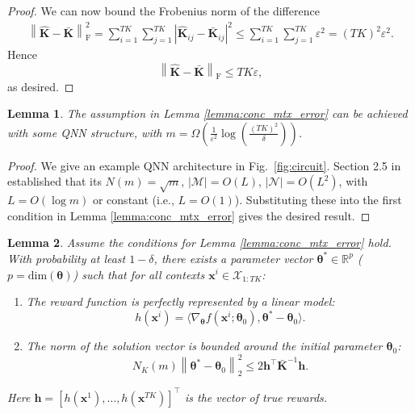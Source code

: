 \documentclass[pdflatex,sn-mathphys-num]{sn-jnl}%
\theoremstyle{thmstyleone}%
\theoremstyle{thmstyletwo}%
\theoremstyle{thmstylethree}%
\newtheorem{lemma}{Lemma}[section]
\newcommand{\norm}[1]{\left\lVert#1\right\rVert}
\newcommand{\abs}[1]{\left\vert#1\right\vert}
\newcommand{\R}{\mathbb{R}}
\newcommand{\bigOmega}{\Omega}
\newcommand{\xbf}{\mathbf{x}}
\newcommand{\hbf}{\mathbf{h}}
\newcommand{\thetabf}{\bm{\theta}}
\begin{document}
\begin{appendices}
\begin{proof}
\noindent We can now bound the Frobenius norm of the difference
\begin{align*}
\norm{\hat{\mathbf{K}} - \bar{\mathbf{K}}}_{\mathrm{F}}^2 = \sum_{i=1}^{TK}\sum_{ j=1}^{TK}\abs{\hat{\mathbf{K}}_{ij} - \bar{\mathbf{K}}_{ij}} ^2 
\le\sum_{i=1}^{TK}\sum_{ j=1}^{TK} \varepsilon^2 
= (TK)^2 \varepsilon^2.
\end{align*}
Hence
$$ \norm{\hat{\mathbf{K}} - \bar{\mathbf{K}}}_{\mathrm{F}} \le TK\varepsilon, $$ as desired.
\end{proof}



\begin{lemma} \label{lemma:qnn_structure}
The assumption in Lemma \ref{lemma:conc_mtx_error} can be achieved with some QNN structure, with $m = \bigOmega\left( \frac{1}{\varepsilon^2}\log\left(\frac{(TK)^2}{\delta}\right) \right)$.
\end{lemma}

\begin{proof}
    We give an example QNN architecture in Fig.~\ref{fig:circuit}. Section 2.5 in \cite{Girardi2025} established that its $N(m) = \sqrt{m}$, $|\mathcal{M}|=O(L)$, $|\mathcal{N}|=O(L^2)$, with $L=O(\log m)$ or constant (i.e., $L =O(1)$). Substituting these into the first condition in Lemma \ref{lemma:conc_mtx_error} gives the desired result.
\end{proof}
    


\begin{lemma} \label{lemma:realizable}
Assume the conditions for Lemma \ref{lemma:conc_mtx_error} hold. With probability at least $1-\delta$, there exists a parameter vector ${\thetabf}^* \in \R^{p}$ ($p=\mathrm{dim}( {\thetabf})$) such that for all contexts $\xbf^i \in \mathcal{X}_{1:TK}$:
\begin{enumerate}
    \item The reward function is perfectly represented by a linear model:
    $$ h(\xbf^i) = \langle \nabla_{\thetabf} f(\xbf^i;\thetabf_0), {\thetabf}^* - {\thetabf}_0 \rangle. $$
    \item The norm of the solution vector is bounded around the initial parameter $\bm{\theta}_0$:
    $$ N_K(m)\norm{{\thetabf}^* - {\thetabf}_0}_2^2 \le 2 \hbf^\top \bar{\mathbf{K}}^{-1} \hbf. $$
\end{enumerate}
Here $\hbf = [h(\xbf^1), \dots, h(\xbf^{TK})]^\top$ is the vector of true rewards.
\end{lemma}


\end{appendices}
\end{document}
